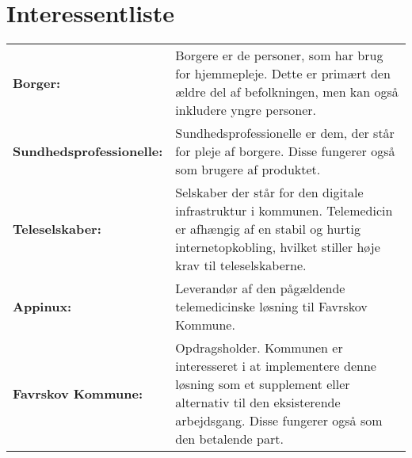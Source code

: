 \documentclass[10pt,a4paper]{article}
\begin{document}
\section{Interessentliste}

\begin{table}[H]
\begin{tabularx}{\linewidth}{lX}
\textbf{Borger:} & Borgere er de personer, som har brug for hjemmepleje. Dette er primært den ældre del af befolkningen, men kan også inkludere yngre personer. \\ 

\textbf{Sundhedsprofessionelle:} & Sundhedsprofessionelle er dem, der står for pleje af borgere. Disse fungerer også som brugere af produktet. \\

\textbf{Teleselskaber:} & Selskaber der står for den digitale infrastruktur i kommunen. Telemedicin er afhængig af en stabil og hurtig internetopkobling, hvilket stiller høje krav til teleselskaberne.\\

\textbf{Appinux:} & Leverandør af den pågældende telemedicinske løsning til Favrskov Kommune.\\

\textbf{Favrskov Kommune:} & Opdragsholder. Kommunen er interesseret i at implementere denne løsning som et supplement eller alternativ til den eksisterende arbejdsgang. Disse fungerer også som den betalende part. 

\end{tabularx}
\end{table}
\end{document}
